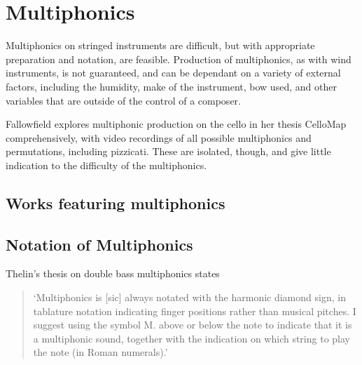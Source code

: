 \section{Multiphonics}
Multiphonics on stringed instruments are difficult, but with appropriate preparation and notation, are feasible. Production of multiphonics, as with wind instruments, is not guaranteed, and can be dependant on a variety of external factors, including the humidity, make of the instrument, bow used, and other variables that are outside of the control of a composer.

Fallowfield explores multiphonic production on the cello in her thesis CelloMap comprehensively, with video recordings of all possible multiphonics and permutations, including pizzicati.\autocite{fallowfieldCelloMapHandbook2009} These are isolated, though, and give little indication to the difficulty of the multiphonics.

\subsection{Works featuring multiphonics}
\lipsum[2]

\subsection{Notation of Multiphonics}

Thelin's thesis on double bass multiphonics states
\begin{quotation}
    `Multiphonics is [sic] always notated with the harmonic diamond sign, in tablature notation
indicating finger positions rather than musical pitches. I suggest using the symbol M. above or
below the note to indicate that it is a multiphonic sound, together with the indication on which
string to play the note (in Roman numerals).'\autocite[6]{thelinMultiphonicsDoubleBass2011}
\end{quotation}


